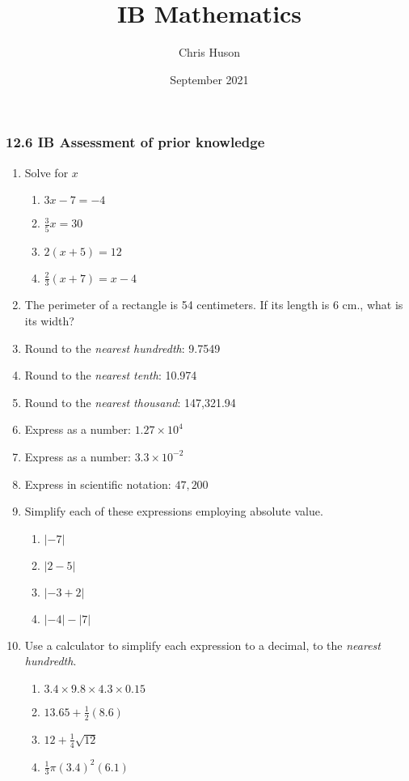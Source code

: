 \documentclass[12pt, twoside]{article}
\title{IB Mathematics}
\author{Chris Huson}
\date{September 2021}
\begin{document}
\subsubsection*{12.6 IB Assessment of prior knowledge}

\begin{enumerate}[itemsep=0.75cm]
  \item Solve for $x$
  \begin{multicols}{2}
    \begin{enumerate}[itemsep=3cm]
      \item $3x-7=-4$
      \item $\frac{3}{5}x =30$
      \item $2(x+5)=12$
      \item $\frac{2}{3}(x+7)=x-4$
    \end{enumerate}
  \end{multicols} \vspace{3cm}

  \item The perimeter of a rectangle is 54 centimeters. If its length is 6 cm., what is its width? \vspace{3cm}
  
  \item Round to the \emph{nearest hundredth}: 9.7549
  \item Round to the \emph{nearest tenth}: 10.974
  \item Round to the \emph{nearest thousand}: 147,321.94

  \item Express as a number: $1.27 \times 10^4$
  \item Express as a number: $3.3 \times 10^{-2}$
  \item Express in scientific notation: $47,200$
  
  \newpage
  \item Simplify each of these expressions employing absolute value.
  \begin{multicols}{2}
    \begin{enumerate}[itemsep=1.7cm]
      \item $|-7|$
      \item $|2-5|$
      \item $|-3+2|$
      \item $|-4|-|7|$
    \end{enumerate}
  \end{multicols}

  \item Use a calculator to simplify each expression to a decimal, to the \emph{nearest hundredth}.
  \begin{multicols}{2}
  \begin{enumerate}[itemsep=1.5cm]
    \item $3.4 \times 9.8 \times 4.3 \times 0.15$ 
    \item $13.65 + \frac{1}{2} (8.6)$  
    \item $12 + \frac{1}{4} \sqrt{12}$
    \item $\frac{1}{3} \pi (3.4)^2(6.1)$
  \end{enumerate}
  \end{multicols}\vspace{0.5cm}


\end{enumerate}
\end{document}
